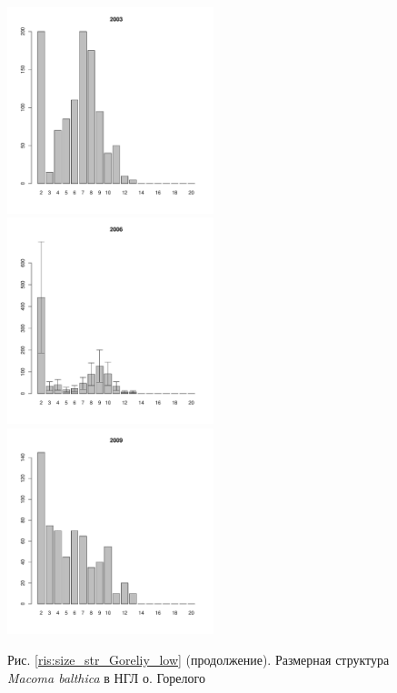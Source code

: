 \documentclass[12pt, a4paper]{article}
\begin{document}
\begin{figure}[h]
\begin{multicols}{3}
\hfill
\includegraphics[width=60mm]{../White_Sea/Luvenga_Goreliy/low2_2003_.pdf}
\hfill
\includegraphics[width=60mm]{../White_Sea/Luvenga_Goreliy/low2_2006_.pdf}
\hfill
\includegraphics[width=60mm]{../White_Sea/Luvenga_Goreliy/low2_2009_.pdf}
\end{multicols}



\begin{center}
Рис. \ref{ris:size_str_Goreliy_low} (продолжение). Размерная структура {\it Macoma balthica} в НГЛ о. Горелого

\end{center}
\end{figure}
\end{document}
